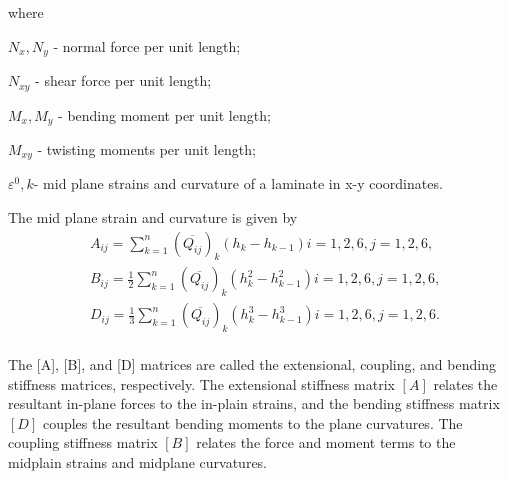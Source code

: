 where

$N_x,N_y $  - normal force per unit length;

$N_{xy} $  - shear force per unit length;

$M_x, M_y $ - bending moment per unit length;

$M_{xy} $  - twisting moments per unit length;

$\varepsilon^{0}, k $- mid plane strains and curvature of a laminate in x-y
coordinates.

The mid plane strain and curvature is given by
\begin{equation}
    \begin{split}
    &A_{ij}=\sum_{k=1}^{n}(\overline{Q_{ij}})_k(h_k-h_{k-1})  i=1,2,6, j=1,2,6,\\
    &B_{ij}=\frac{1}{2}\sum_{k=1}^{n}(\overline{Q_{ij}})_k(h_k^2 - h_{k-1}^2)
	i=1,2,6, j=1,2,6,\\
    &D_{ij}=\frac{1}{3}\sum_{k=1}^{n}(\overline{Q_{ij}})_k(h_k^3 - h_{k-1}^3)
	i=1,2,6, j=1,2,6.\\
    \end{split}
\end{equation}

The [A], [B], and [D] matrices are called the extensional, coupling, and bending stiffness matrices,
respectively. The extensional stiffness matrix $[A]$ relates the resultant in-plane forces to the
in-plain strains, and the bending stiffness matrix $[D]$ couples the resultant bending moments to
the plane curvatures.  The coupling stiffness matrix $[B]$ relates the force and moment terms to the
midplain strains and midplane curvatures.
